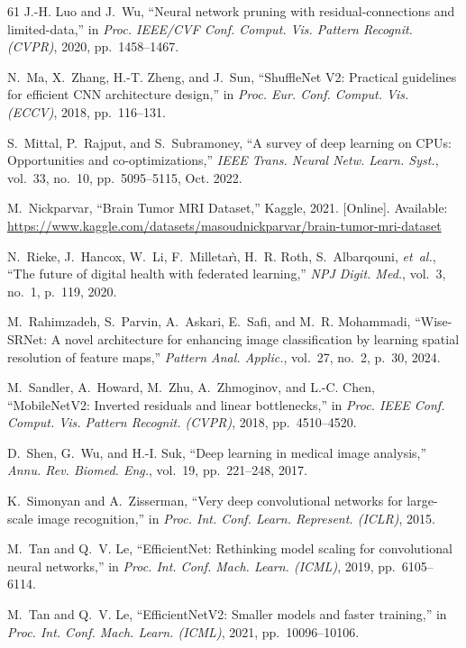 \begin{thebibliography}{61}
J.-H. Luo and J.~Wu, ``Neural network pruning with residual-connections and limited-data,'' in \emph{Proc. IEEE/CVF Conf. Comput. Vis. Pattern Recognit. (CVPR)}, 2020, pp.~1458--1467.

N.~Ma, X.~Zhang, H.-T. Zheng, and J.~Sun, ``ShuffleNet V2: Practical guidelines for efficient CNN architecture design,'' in \emph{Proc. Eur. Conf. Comput. Vis. (ECCV)}, 2018, pp.~116--131.

S.~Mittal, P.~Rajput, and S.~Subramoney, ``A survey of deep learning on CPUs: Opportunities and co-optimizations,'' \emph{IEEE Trans. Neural Netw. Learn. Syst.}, vol.~33, no.~10, pp.~5095--5115, Oct. 2022. 

M.~Nickparvar, ``Brain Tumor MRI Dataset,'' Kaggle, 2021. [Online]. Available: \url{https://www.kaggle.com/datasets/masoudnickparvar/brain-tumor-mri-dataset}

N.~Rieke, J.~Hancox, W.~Li, F.~Milletar{\`\i}, H.~R. Roth, S.~Albarqouni, \emph{et~al.}, ``The future of digital health with federated learning,'' \emph{NPJ Digit. Med.}, vol.~3, no.~1, p.~119, 2020. 

M.~Rahimzadeh, S.~Parvin, A.~Askari, E.~Safi, and M.~R. Mohammadi, ``Wise-SRNet: A novel architecture for enhancing image classification by learning spatial resolution of feature maps,'' \emph{Pattern Anal. Applic.}, vol.~27, no.~2, p.~30, 2024. 

M.~Sandler, A.~Howard, M.~Zhu, A.~Zhmoginov, and L.-C. Chen, ``MobileNetV2: Inverted residuals and linear bottlenecks,'' in \emph{Proc. IEEE Conf. Comput. Vis. Pattern Recognit. (CVPR)}, 2018, pp.~4510--4520.

D.~Shen, G.~Wu, and H.-I. Suk, ``Deep learning in medical image analysis,'' \emph{Annu. Rev. Biomed. Eng.}, vol.~19, pp.~221--248, 2017. 

K.~Simonyan and A.~Zisserman, ``Very deep convolutional networks for large-scale image recognition,'' in \emph{Proc. Int. Conf. Learn. Represent. (ICLR)}, 2015.

M.~Tan and Q.~V. Le, ``EfficientNet: Rethinking model scaling for convolutional neural networks,'' in \emph{Proc. Int. Conf. Mach. Learn. (ICML)}, 2019, pp.~6105--6114.

M.~Tan and Q.~V. Le, ``EfficientNetV2: Smaller models and faster training,'' in \emph{Proc. Int. Conf. Mach. Learn. (ICML)}, 2021, pp.~10096--10106.


\end{thebibliography}
